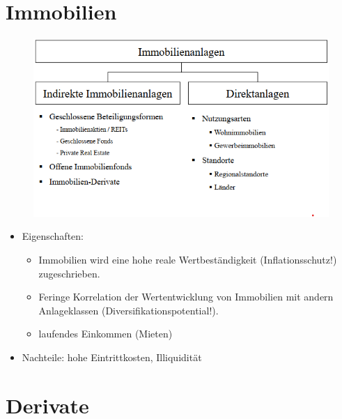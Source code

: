 \documentclass[12pt]{report}
\theoremstyle{dotless}
\theoremstyle{definition}
\begin{document}
\section{Immobilien}

\begin{figure}[ht]
	\centering
	\includegraphics[width= \textwidth]{Bilder/Immobilien.png}
\end{figure}

\begin{itemize}
\item Eigenschaften:
\begin{itemize}
\item Immobilien wird eine hohe reale Wertbeständigkeit (Inflationsschutz!)
zugeschrieben.
\item Feringe Korrelation der Wertentwicklung von Immobilien mit
andern Anlageklassen (Diversifikationspotential!).
\item laufendes Einkommen (Mieten) 
\end{itemize}
\item Nachteile: hohe Eintrittkosten, Illiquidität
\end{itemize}


\section{Derivate}
\end{document}
